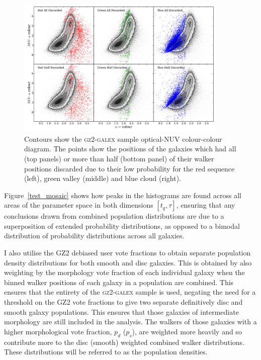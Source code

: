 \begin{figure}
\includegraphics[width=0.9\textwidth]{starpy/discarded_galaxy_colour_colour.pdf}
\caption[Colours of discarded galaxies]{Contours show the \textsc{gz2-galex} sample optical-NUV colour-colour diagram. The points show the positions of the galaxies which had all (top panels) or more than half (bottom panel) of their walker positions discarded due to their low probability for the red sequence (left), green valley (middle) and blue cloud (right).}
\label{discarded}
\end{figure}

Figure~\ref{test_mosaic} shows how peaks in the histograms are found across all areas of the parameter space in both dimensions $[t_q, \tau]$, ensuring that any conclusions drawn from combined population distributions are due to a superposition of extended probability distributions, as opposed to a bimodal distribution of probability distributions across all galaxies.

I also utilise the GZ2 debiased user vote fractions to obtain separate population density distributions for both smooth and disc galaxies. This is obtained by also weighting by the morphology vote fraction of each individual galaxy when the binned walker positions of each galaxy in a population are combined. This ensures that the entirety of the \textsc{gz2-galex} sample is used, negating the need for a threshold on the GZ2 vote fractions \citep[e.g., $p_d > 0.8$ as used in][]{schawinski14} to give two separate definitively disc and smooth galaxy populations. This ensures that those galaxies of intermediate morphology are still included in the analysis. The walkers of those galaxies with a higher morphological vote fraction, $p_d$ ($p_s$), are weighted more heavily and so contribute more to the disc (smooth) weighted combined walker distributions. These distributions will be referred to as the population densities.

